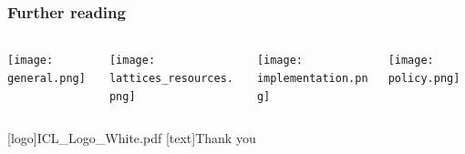 \documentclass[
aspectratio=169, %
t, %
onlytextwidth, %
10pt, %
]{beamer}
\begin{document}
\begin{frame}
    \frametitle{Further reading}
    \begin{adjustwidth}{0cm}{0.15\textwidth} %
        \begin{columns}[T] %
            \begin{column}{0.3\linewidth} %
                \texttt{[image: general.png]}
            \end{column}
            \begin{column}{0.3\linewidth} %
                \texttt{[image: lattices\_resources.png]}
            \end{column}
            \begin{column}{0.3\linewidth} %

                \texttt{[image: implementation.png]}
            \end{column}
            \begin{column}{0.3\linewidth} %
                \texttt{[image: policy.png]}
            \end{column}
        \end{columns}
    \end{adjustwidth}
\end{frame}


\begingroup
	[logo]{ICL_Logo_White.pdf} %
	[text]{Thank you} %
	
\endgroup

\end{document}
